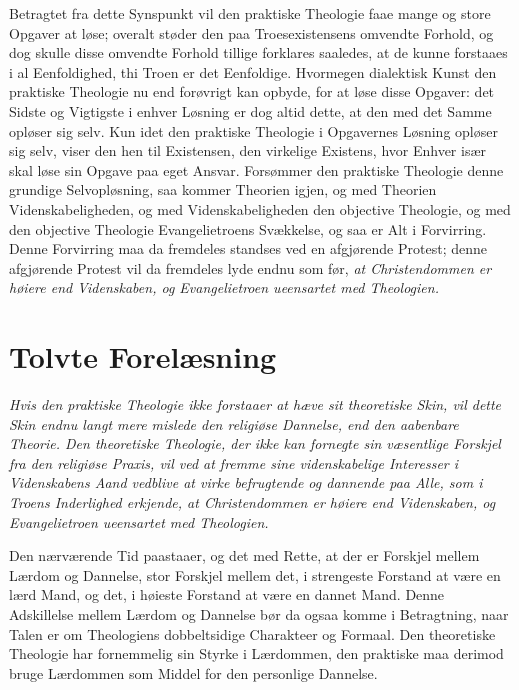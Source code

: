 \documentclass[12pt,a4paper]{book}
\newcommand{\opage}[1]{\marginnote{\footnotesize\textit{[#1]}}}
\begin{document}
Betragtet fra dette Synspunkt vil den praktiske Theologie faae mange og store
Opgaver at løse; overalt støder den paa Troesexistensens omvendte Forhold, og
dog skulle disse omvendte Forhold tillige forklares saaledes, at de kunne
forstaaes i al
\opage{158} Eenfoldighed, thi Troen er det Eenfoldige. Hvormegen dialektisk Kunst den
praktiske Theologie nu end forøvrigt kan opbyde, for at løse disse Opgaver: det
Sidste og Vigtigste i enhver Løsning er dog altid dette, at den med det Samme
opløser sig selv. Kun idet den praktiske Theologie i Opgavernes Løsning opløser
sig selv, viser den hen til Existensen, den virkelige Existens, hvor Enhver især
skal løse sin Opgave paa eget Ansvar. Forsømmer den praktiske Theologie denne
grundige Selvopløsning, saa kommer Theorien igjen, og med Theorien
Videnskabeligheden, og med Videnskabeligheden den objective Theologie, og med
den objective Theologie Evangelietroens Svækkelse, og saa er Alt i Forvirring.
Denne Forvirring maa da fremdeles standses ved en afgjørende Protest; denne
afgjørende Protest vil da fremdeles lyde endnu som før,
\emph{at Christendommen er høiere end Videnskaben, og Evangelietroen ueensartet
med Theologien.}

\chapter*{Tolvte Forelæsning}
\label{ch:forel12}

\begin{center}\itshape
Hvis den praktiske Theologie ikke forstaaer at hæve sit theoretiske Skin,
vil dette Skin endnu langt mere mislede den religiøse Dannelse, end den
aabenbare Theorie. Den theoretiske Theologie, der ikke kan fornegte sin
væsentlige Forskjel fra den religiøse Praxis, vil ved at fremme sine
videnskabelige Interesser i Videnskabens Aand vedblive at virke
befrugtende og dannende paa Alle, som i Troens Inderlighed erkjende, at
Christendommen er høiere end Videnskaben, og Evangelietroen ueensartet med
Theologien.
\end{center}

\opage{159} %
Den nærværende Tid paastaaer, og det med Rette, at der er Forskjel mellem
Lærdom og Dannelse, stor Forskjel mellem det, i strengeste Forstand at være
en lærd Mand, og det, i høieste Forstand at være en dannet Mand. Denne
Adskillelse mellem Lærdom og Dannelse bør da ogsaa komme i Betragtning, naar
Talen er om Theologiens dobbeltsidige Charakteer og Formaal. Den theoretiske
Theologie har fornemmelig sin Styrke i Lærdommen, den praktiske maa derimod
bruge Lærdommen som Middel for den personlige Dannelse.
\end{document}
